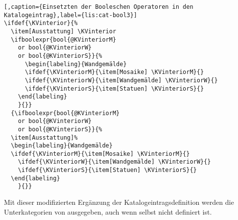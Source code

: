 \begin{lstlisting}[,caption={Einsetzten der Booleschen Operatoren in den Katalogeintrag},label={lis:cat-bool3}]
\ifdef{\KVinterior}{%
  \item[Ausstattung] \KVinterior 
  \ifboolexpr{bool{@KVinteriorM} 
    or bool{@KVinteriorW} 
    or bool{@KVinteriorS}}{%
      \begin{labeling}{Wandgemälde}
      \ifdef{\KVinteriorM}{\item[Mosaike] \KVinteriorM}{}
      \ifdef{\KVinteriorW}{\item[Wandgemälde] \KVinteriorW}{}
      \ifdef{\KVinteriorS}{\item[Statuen] \KVinteriorS}{}
    \end{labeling}
    }{}}
  {\ifboolexpr{bool{@KVinteriorM} 
    or bool{@KVinteriorW} 
    or bool{@KVinteriorS}}{%
  \item[Ausstattung]%
  \begin{labeling}{Wandgemälde}	
  \ifdef{\KVinteriorM}{\item[Mosaike] \KVinteriorM}{}
    \ifdef{\KVinteriorW}{\item[Wandgemälde] \KVinteriorW}{}
    \ifdef{\KVinteriorS}{\item[Statuen] \KVinteriorS}{}
  \end{labeling}
	}{}}
\end{lstlisting}
Mit dieser modifizierten Ergänzung der Katalogeintragsdefinition werden die Unterkategorien von  ausgegeben, 
auch wenn  selbst nicht definiert ist.